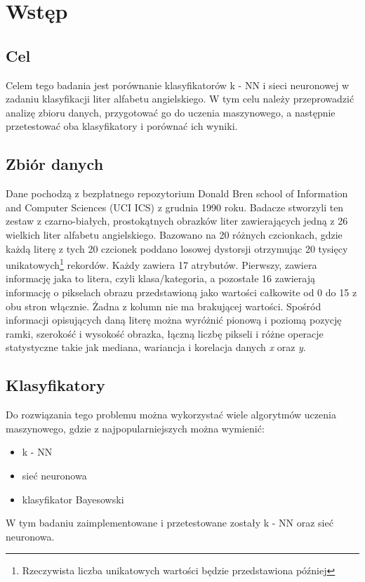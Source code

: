 \section{Wstęp}\label{sec:wstep}

\subsection{Cel}\label{subsec:cel}
Celem tego badania jest porównanie klasyfikatorów k - NN i sieci neuronowej w zadaniu klasyfikacji liter alfabetu angielskiego.
W tym celu należy przeprowadzić analizę zbioru danych, przygotować go do uczenia maszynowego, a następnie przetestować oba klasyfikatory i porównać ich wyniki.

\subsection{Zbiór danych}\label{subsec:zbiordanych}
Dane pochodzą z bezpłatnego repozytorium \cite{misc_letter_recognition_59}
Donald Bren school of Information and Computer Sciences (UCI ICS) z grudnia 1990 roku.
Badacze stworzyli ten zestaw z czarno-białych, prostokątnych obrazków liter zawierających jedną z 26 wielkich liter alfabetu angielskiego.
Bazowano na 20 różnych czcionkach, gdzie każdą literę z tych 20 czcionek poddano losowej dystorsji otrzymując 20 tysięcy 
unikatowych\footnote{Rzeczywista liczba unikatowych wartości będzie przedstawiona później} rekordów.
Każdy zawiera 17 atrybutów. Pierwszy, zawiera informację jaka to litera, czyli klasa/kategoria, 
a pozostałe 16 zawierają informację o pikselach obrazu przedstawioną jako wartości całkowite od 0 do 15 z obu stron włącznie.
Żadna z kolumn nie ma brakującej wartości. Spośród informacji opisujących daną literę można wyróżnić pionową i poziomą pozycję ramki, 
szerokość i wysokość obrazka, łączną liczbę pikseli i różne operacje statystyczne
takie jak mediana, wariancja i korelacja danych \textit{x} oraz \textit{y}.

\subsection{Klasyfikatory}\label{subsec:klasyfikatory}
Do rozwiązania tego problemu można wykorzystać wiele algorytmów uczenia maszynowego, gdzie z najpopularniejszych można wymienić:
\begin{itemize}
    \item k - NN
    \item sieć neuronowa
    \item klasyfikator Bayesowski
\end{itemize}
W tym badaniu zaimplementowane i przetestowane zostały k - NN oraz sieć neuronowa.

